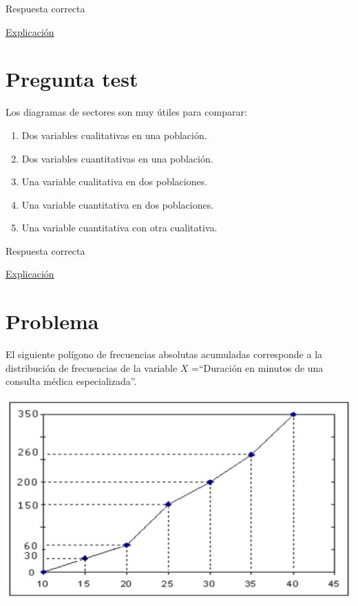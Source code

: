 \documentclass[
]{book}
\providecommand{\tightlist}{%
  \setlength{\itemsep}{0pt}\setlength{\parskip}{0pt}}
\begin{document}
Respuesta correcta

\href{https://1fjmanzano.github.io/bioestadistica/medidas-de-posicio\%CC\%81n-dispersio\%CC\%81n-y-forma.html\#medidas-de-posicio\%CC\%81n-centrales}{Explicación}

\hypertarget{pregunta-test-51}{%
\section{Pregunta test}\label{pregunta-test-51}}

Los diagramas de sectores son muy útiles para comparar:

\begin{enumerate}
\def\labelenumi{\alph{enumi})}
\tightlist
\item
  Dos variables cualitativas en una población.
\item
  Dos variables cuantitativas en una población.
\item
  Una variable cualitativa en dos poblaciones.
\item
  Una variable cuantitativa en dos poblaciones.
\item
  Una variable cuantitativa con otra cualitativa.
\end{enumerate}

Respuesta correcta

\href{https://1fjmanzano.github.io/bioestadistica/diagramas-de-barras-y-sectores.html}{Explicación}

\hypertarget{problema-5}{%
\section{Problema}\label{problema-5}}

El siguiente polígono de frecuencias absolutas acumuladas corresponde a la distribución de frecuencias de la variable \(X\) =``Duración en minutos de una consulta médica especializada''.

\includegraphics[width=19.47in]{img/2_1}
\end{document}
